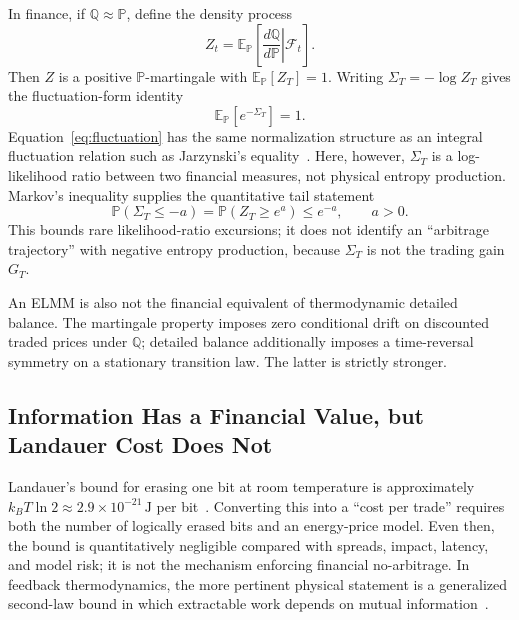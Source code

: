\documentclass[aps,pra,reprint,superscriptaddress,amsmath,amssymb,floatfix]{revtex4-2}
\theoremstyle{plain}
\theoremstyle{definition}
\theoremstyle{remark}
\begin{document}
In finance, if \(\mathbb{Q}\approx\mathbb{P}\), define the density process
\begin{equation}
  Z_t=\mathbb{E}_{\mathbb{P}}\!\left[
    \left.\frac{d\mathbb{Q}}{d\mathbb{P}}\right|\mathcal{F}_t
  \right].
  \label{eq:density}
\end{equation}
Then \(Z\) is a positive \(\mathbb{P}\)-martingale with
\(\mathbb{E}_{\mathbb{P}}[Z_T]=1\). Writing
\(\Sigma_T=-\log Z_T\) gives the fluctuation-form identity
\begin{equation}
  \mathbb{E}_{\mathbb{P}}\!\left[e^{-\Sigma_T}\right]=1.
  \label{eq:fluctuation}
\end{equation}
Equation~\eqref{eq:fluctuation} has the same normalization structure as an
integral fluctuation relation such as Jarzynski's
equality~\cite{Jarzynski1997}. Here, however, \(\Sigma_T\) is a
log-likelihood ratio between two financial measures, not physical entropy
production. Markov's inequality supplies the quantitative tail statement
\begin{equation}
  \mathbb{P}(\Sigma_T\leq-a)
  =\mathbb{P}(Z_T\geq e^a)\leq e^{-a},
  \qquad a>0.
  \label{eq:fluctuationtail}
\end{equation}
This bounds rare likelihood-ratio excursions; it does not identify an
``arbitrage trajectory'' with negative entropy production, because
\(\Sigma_T\) is not the trading gain \(G_T\).

An ELMM is also not the financial equivalent of thermodynamic detailed
balance. The martingale property imposes zero conditional drift on discounted
traded prices under \(\mathbb{Q}\); detailed balance additionally imposes a
time-reversal symmetry on a stationary transition law. The latter is strictly
stronger.

\subsection{Information Has a Financial Value, but Landauer Cost Does Not}

Landauer's bound for erasing one bit at room temperature is approximately
\(k_BT\ln2\approx2.9\times10^{-21}\,\mathrm{J}\)
per bit~\cite{landauer:61,bennett-82}. Converting this into a ``cost per
trade'' requires both the number of logically erased bits and an energy-price
model. Even then, the bound is quantitatively negligible compared with
spreads, impact, latency, and model risk; it is not the mechanism enforcing
financial no-arbitrage. In feedback thermodynamics, the more pertinent physical
statement is a generalized second-law bound in which extractable work depends
on mutual information~\cite{SagawaUeda2008,Sagawa2012}.
\end{document}

